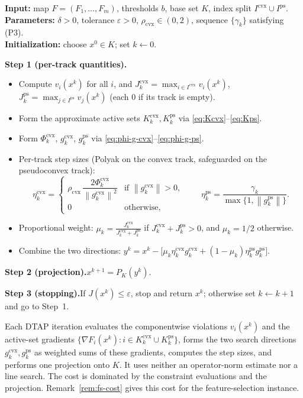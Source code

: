 \documentclass[]{interact}
\theoremstyle{plain}
\theoremstyle{definition}
\theoremstyle{remark}
\newcommand{\algstep}[1]{\smallskip\noindent\textbf{#1}}
\newcommand{\norm}[1]{\left\lVert #1 \right\rVert}
\newcommand{\cvx}{\mathrm{cvx}}
\newcommand{\ps}{\mathrm{ps}}
\newcommand{\dtap}{\textsc{DTAP}}
\begin{document}
\begin{algorithm}[H]
\caption{Dual-Track Adaptive Projection (DTAP) for the normal-box NSFP
\eqref{eq:nsfp-box}.}
\label{alg:dtap}
\small
\noindent\textbf{Input:} map $F=(F_1,\dots,F_m)$, thresholds $b$, base set $K$, index
split $I^{\cvx}\cup I^{\ps}$.\\
\textbf{Parameters:} $\delta>0$, tolerance $\varepsilon>0$, $\rho_{\cvx}\in(0,2)$,
sequence $\{\gamma_k\}$ satisfying (P3).\\
\textbf{Initialization:} choose $x^0\in K$; set $k\leftarrow 0$.

\algstep{Step 1 (per-track quantities).}
\begin{itemize}[leftmargin=1.6em,itemsep=1pt,topsep=2pt]
\item[(1a)] Compute $v_i(x^k)$ for all $i$, and $J^{\cvx}_k=\max_{i\in I^{\cvx}}v_i(x^k)$,
$J^{\ps}_k=\max_{j\in I^{\ps}}v_j(x^k)$ (each $0$ if its track is empty).
\item[(1b)] Form the approximate active sets $K^{\cvx}_k,K^{\ps}_k$ via
\eqref{eq:Kcvx}--\eqref{eq:Kps}.
\item[(1c)] Form $\Phi^{\cvx}_k$, $g^{\cvx}_k$, $g^{\ps}_k$ via
\eqref{eq:phi-g-cvx}--\eqref{eq:phi-g-ps}.
\item[(1d)] Per-track step sizes (Polyak on the convex track, safeguarded on the
pseudoconvex track):
\[
\eta^{\cvx}_k=\begin{cases}\rho_{\cvx}\,\dfrac{2\Phi^{\cvx}_k}{\norm{g^{\cvx}_k}^2} & \text{if }\norm{g^{\cvx}_k}>0,\\ 0 & \text{otherwise,}\end{cases}
\qquad
\eta^{\ps}_k=\frac{\gamma_k}{\max\{1,\norm{g^{\ps}_k}\}} .
\]
\item[(1e)] Proportional weight:
$\displaystyle \mu_k=\frac{J^{\cvx}_k}{J^{\cvx}_k+J^{\ps}_k}$ if
$J^{\cvx}_k+J^{\ps}_k>0$, and $\mu_k=1/2$ otherwise.
\item[(1f)] Combine the two directions:
$\displaystyle y^k=x^k-\bigl[\mu_k\eta^{\cvx}_k g^{\cvx}_k+(1-\mu_k)\eta^{\ps}_k g^{\ps}_k\bigr].$
\end{itemize}
\algstep{Step 2 (projection).}\quad $x^{k+1}=P_K(y^k)$.

\algstep{Step 3 (stopping).}\quad If $J(x^k)\le\varepsilon$, stop and return $x^k$; otherwise set $k\leftarrow k+1$ and go to Step~1.
\end{algorithm}

Each \dtap{} iteration evaluates the componentwise violations $v_i(x^k)$ and the active-set gradients $\{\nabla F_i(x^k):i\in K^{\cvx}_k\cup K^{\ps}_k\}$, forms the two search directions $g^{\cvx}_k,g^{\ps}_k$ as weighted sums of these gradients, computes the step sizes, and performs one projection onto $K$. It uses neither an operator-norm estimate nor a line search. The cost is dominated by the constraint evaluations and the projection. Remark~\ref{rem:fs-cost} gives this cost for the feature-selection instance.
\end{document}
